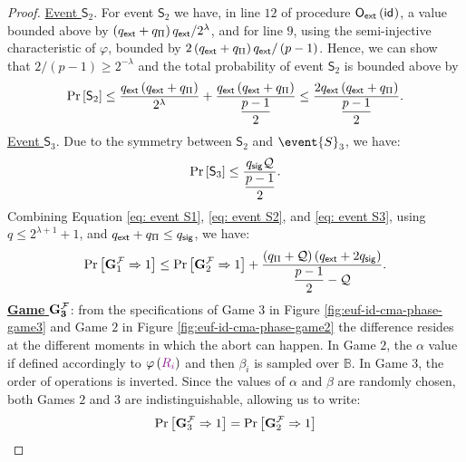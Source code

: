 \documentclass[version=submission, floatrow]{iacrcc}
\begin{document}
\begin{proof}
    \noindent\underline{Event $\mathsf{S}_{2}$}. For event $\mathsf{S}_{2}$ we have, in line $12$ of procedure $\mathsf{O}_{\mathsf{ext}}\left(\mathsf{id}_{}\right)$, a value bounded above by $\left(q_{\mathsf{ext}} + q_{\Pi}\right)q_{\mathsf{ext}}/2^{\lambda}$, and for line $9$, using the semi-injective characteristic of $\varphi$, bounded by $2\left(q_{\mathsf{ext}} + q_{\Pi}\right)q_{\mathsf{ext}}/\left(p-1\right)$. Hence, we can show that $2/\left(p-1\right) \ge 2^{-\lambda}$ and the total probability of event $\mathsf{S}_{2}$ is bounded above by\begin{equation}\label{eq: event S2}
        \mathrm{Pr}\left[\mathsf{S}_{2}\right] \le \dfrac{q_{\mathsf{ext}}\left(q_{\mathsf{ext}} + q_{\Pi}\right)}{2^{\lambda}} + \dfrac{q_{\mathsf{ext}}\left(q_{\mathsf{ext}} + q_{\Pi}\right)}{\dfrac{p-1}{2}} \le \dfrac{2q_{\mathsf{ext}}\left(q_{\mathsf{ext}} + q_{\Pi}\right)}{\dfrac{p-1}{2}}.
    \end{equation}
    \noindent\underline{Event $\mathsf{S}_{3}$}. Due to the symmetry between $\mathsf{S}_{2}$ and $\event{S}_{3}$, we have:
    \begin{equation}\label{eq: event S3}
        \mathrm{Pr}\left[\mathsf{S}_{3}\right] \le \dfrac{q_{\mathsf{sig}} \mathcal{Q}}{\dfrac{p-1}{2}}.
    \end{equation}
    Combining Equation \ref{eq: event S1}, \ref{eq: event S2}, and \ref{eq: event S3}, using $q \le 2^{\lambda + 1} + 1$, and $q_{\mathsf{ext}} + q_{\Pi} \le q_{\mathsf{sig}}$, we have:
    \begin{equation*}
        \mathrm{Pr}\left[\mathbf{G}_{1}^{\mathcal{F}} \Rightarrow 1\right] \le \mathrm{Pr}\left[\mathbf{G}_{2}^{\mathcal{F}} \Rightarrow 1\right] + \dfrac{\left(q_{\Pi} + \mathcal{Q}\right)\left(q_{\mathsf{ext}} + 2q_{\mathsf{sig}}\right)}{\dfrac{p-1}{2} - \mathcal{Q}}.
    \end{equation*}
    \noindent\underline{\textbf{Game} $\mathbf{G_{3}^{\mathcal{F}}}$}: from the specifications of Game $3$ in Figure \ref{fig:euf-id-cma-phase-game3} and Game $2$ in Figure \ref{fig:euf-id-cma-phase-game2} the difference resides at the different moments in which the abort can happen.
    In Game $2$, the $\alpha$ value if defined accordingly to $\varphi\left(\Commitment{R_{i}}\right)$ and then $\beta_{i}$ is sampled over $\mathbb{B}$. 
    In Game $3$, the order of operations is inverted.
    Since the values of $\alpha$ and $\beta$ are randomly chosen, both Games $2$ and $3$ are indistinguishable, allowing us to write:\begin{equation*}
    \mathrm{Pr}\left[\mathbf{G}_{3}^{\mathcal{F}} \Rightarrow 1\right] = \mathrm{Pr}\left[\mathbf{G}_{2}^{\mathcal{F}} \Rightarrow 1\right]
    \end{equation*}
    

\end{proof}
\end{document}
